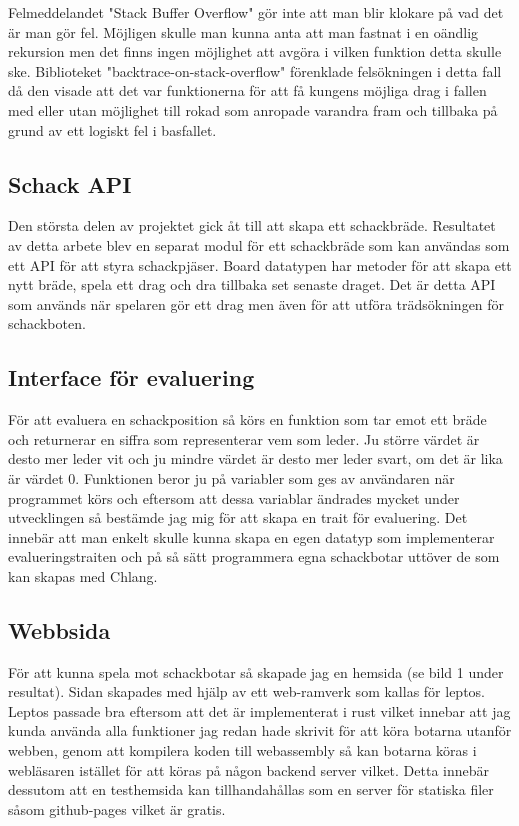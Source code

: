 \documentclass{article}
\begin{document}
	Felmeddelandet "Stack Buffer Overflow" gör inte att man blir klokare på vad det är man gör fel. Möjligen skulle man kunna anta att man fastnat i en oändlig rekursion men det finns ingen möjlighet att avgöra i vilken funktion detta skulle ske. Biblioteket "backtrace-on-stack-overflow" förenklade felsökningen i detta fall då den visade att det var funktionerna för att få kungens möjliga drag i fallen med eller utan möjlighet till rokad som anropade varandra fram och tillbaka på grund av ett logiskt fel i basfallet.

	\subsection{Schack API}
    Den största delen av projektet gick åt till att skapa ett schackbräde. Resultatet av detta arbete blev en separat modul för ett schackbräde som kan användas som ett API för att styra schackpjäser. Board datatypen har metoder för att skapa ett nytt bräde, spela ett drag och dra tillbaka set senaste draget.
    Det är detta API som används när spelaren gör ett drag men även för att utföra trädsökningen för schackboten. 

	\subsection{Interface för evaluering}
    För att evaluera en schackposition så körs en funktion som tar emot ett bräde och returnerar en siffra som representerar vem som leder. Ju större värdet är desto mer leder vit och ju mindre värdet är desto mer leder svart, om det är lika är värdet 0.
    Funktionen beror ju på variabler som ges av användaren när programmet körs och eftersom att dessa variablar ändrades mycket under utvecklingen så bestämde jag mig för att skapa en trait för evaluering. Det innebär att man enkelt skulle kunna skapa en egen datatyp som implementerar evalueringstraiten och på så sätt programmera egna schackbotar uttöver de som kan skapas med Chlang.

	\subsection{Webbsida}
    För att kunna spela mot schackbotar så skapade jag en hemsida (se bild 1 under resultat). Sidan skapades med hjälp av ett web-ramverk som kallas för leptos. Leptos passade bra eftersom att det är implementerat i rust vilket innebar att jag kunda använda alla funktioner jag redan hade skrivit för att köra botarna utanför webben, genom att kompilera koden till webassembly så kan botarna köras i webläsaren istället för att köras på någon backend server vilket. Detta innebär dessutom att en testhemsida kan tillhandahållas som en server för statiska filer såsom github-pages vilket är gratis.
\end{document}
